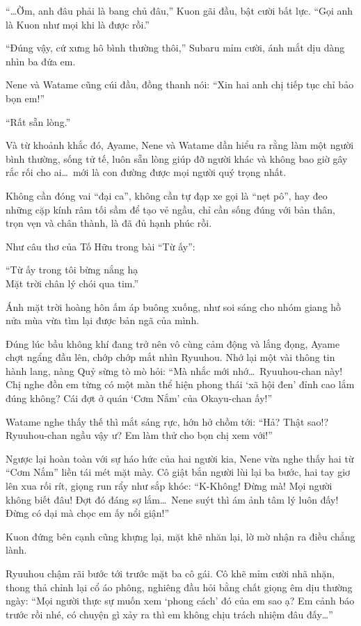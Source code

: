 \documentclass[../main.tex]{subfiles}
\begin{document}
``\dots Ờm, anh đâu phải là bang chủ đâu,'' Kuon gãi đầu, bật cười bất lực. ``Gọi anh là Kuon như mọi khi là được rồi.''

``Đúng vậy, cứ xưng hô bình thường thôi,'' Subaru mỉm cười, ánh mắt dịu dàng nhìn ba đứa em.

Nene và Watame cũng cúi đầu, đồng thanh nói: ``Xin hai anh chị tiếp tục chỉ bảo bọn em!''

``Rất sẵn lòng.''

Và từ khoảnh khắc đó, Ayame, Nene và Watame dần hiểu ra rằng làm một người bình thường, sống tử tế, luôn sẵn lòng giúp đỡ người khác và không bao giờ gây rắc rối cho ai\dots\ mới là con đường được mọi người quý trọng nhất.

Không cần đóng vai ``đại ca'', không cần tự đạp xe gọi là ``nẹt pô'', hay đeo những cặp kính râm tối sầm để tạo vẻ ngầu, chỉ cần sống đúng với bản thân, trọn vẹn và chân thành, là đã đủ hạnh phúc rồi.

Như câu thơ của Tố Hữu trong bài ``Từ ấy'':

\tabs\tabs\tabs\tabs\tabs  ``Từ ấy trong tôi bừng nắng hạ\\
\tabs\tabs\tabs\tabs\tabs  Mặt trời chân lý chói qua tim.''

Ánh mặt trời hoàng hôn ấm áp buông xuống, như soi sáng cho nhóm giang hồ nửa mùa vừa tìm lại được bản ngã của mình.

\ct

Đúng lúc bầu không khí đang trở nên vô cùng cảm động và lắng đọng, Ayame chợt ngẩng đầu lên, chớp chớp mắt nhìn Ryuuhou. Nhớ lại một vài thông tin hành lang, nàng Quỷ sừng tò mò hỏi: ``Mà nhắc mới nhớ\dots\ Ryuuhou-chan này! Chị nghe đồn em từng có một màn thể hiện phong thái `xã hội đen' đỉnh cao lắm đúng không? Cái đợt ở quán `Cơm Nắm' của Okayu-chan ấy!''

Watame nghe thấy thế thì mắt sáng rực, hớn hở chồm tới: ``Hả? Thật sao!? Ryuuhou-chan ngầu vậy ư? Em làm thử cho bọn chị xem với!''

Ngược lại hoàn toàn với sự háo hức của hai người kia, Nene vừa nghe thấy hai từ ``Cơm Nắm'' liền tái mét mặt mày. Cô giật bắn người lùi lại ba bước, hai tay giơ lên xua rối rít, giọng run rẩy như sắp khóc: ``K-Không! Đừng mà! Mọi người không biết đâu! Đợt đó đáng sợ lắm\dots\ Nene suýt thì ám ảnh tâm lý luôn đấy! Đừng có dại mà chọc em ấy nổi giận!''

Kuon đứng bên cạnh cũng khựng lại, mặt khẽ nhăn lại, lờ mờ nhận ra điều chẳng lành.

Ryuuhou chậm rãi bước tới trước mặt ba cô gái. Cô khẽ mỉm cười nhã nhặn, thong thả chỉnh lại cổ áo phông, nghiêng đầu hỏi bằng chất giọng êm dịu thường ngày: ``Mọi người thực sự muốn xem `phong cách' đó của em sao ạ? Em cảnh báo trước rồi nhé, có chuyện gì xảy ra thì em không chịu trách nhiệm đâu đấy\dots''
\end{document}
